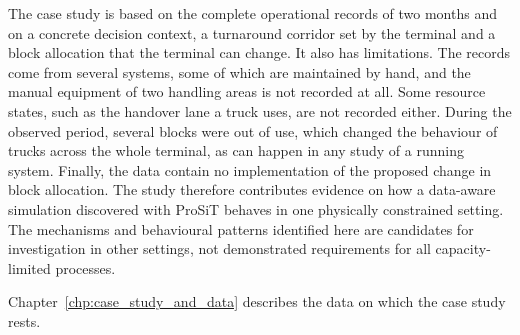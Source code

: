 The case study is based on the complete operational records of two months and on
a concrete decision context, a turnaround corridor set by the terminal and a
block allocation that the terminal can change. It also has limitations. The
records come from several systems, some of which are maintained by hand, and the
manual equipment of two handling areas is not recorded at all. Some resource
states, such as the handover lane a truck uses, are not recorded either. During
the observed period, several blocks were out of use, which changed the behaviour
of trucks across the whole terminal, as can happen in any study of a running
system. Finally, the data contain no implementation of the proposed change in
block allocation. The study therefore contributes evidence on how a data-aware
simulation discovered with ProSiT behaves in one physically constrained setting.
The mechanisms and behavioural patterns identified here are candidates for
investigation in other settings, not demonstrated requirements for all
capacity-limited processes.

Chapter~\ref{chp:case_study_and_data} describes the data on which the case study
rests.
